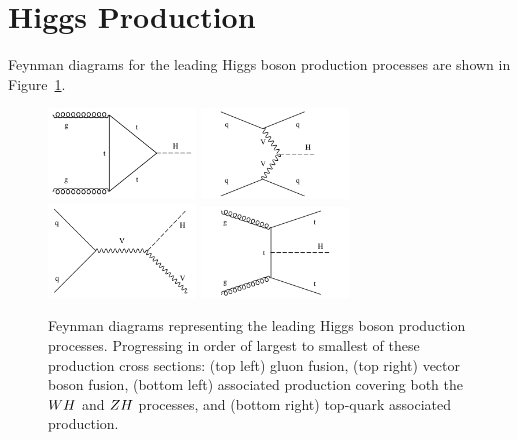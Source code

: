 \section{Higgs Production}

Feynman diagrams for the leading Higgs boson production processes
are shown in Figure~\ref{fig:higgs_feyn}.

\begin{figure}[htbp]
\centering
     \includegraphics[width=0.35\textwidth]{phenomology_of_processes/plots/feyn_ggH.pdf}
     \includegraphics[width=0.35\textwidth]{phenomology_of_processes/plots/feyn_qqH.pdf}
     \includegraphics[width=0.35\textwidth]{phenomology_of_processes/plots/feyn_VH.pdf}
     \includegraphics[width=0.35\textwidth]{phenomology_of_processes/plots/feyn_ttH.pdf}
     \caption{
Feynman diagrams representing the leading Higgs boson production processes.
Progressing in order of largest to smallest of these production cross sections:
(top left) gluon fusion, (top right) vector boson fusion, (bottom left)
associated production covering both the $WH$ and $ZH$ processes,
and (bottom right) top-quark associated production.
     }
     \label{fig:higgs_feyn}
\end{figure}

